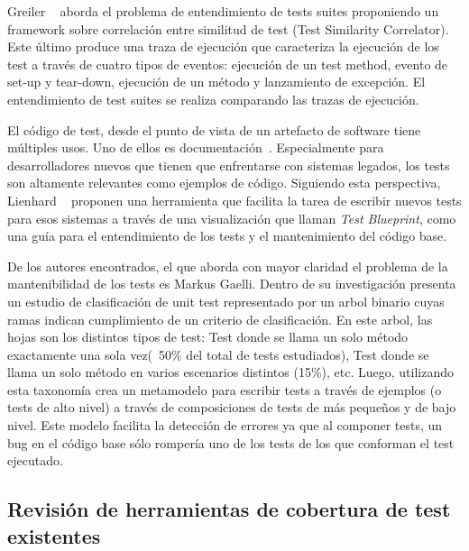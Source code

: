 \par Greiler \etal~\cite{Grei12a} aborda el problema de entendimiento de tests suites proponiendo un framework sobre correlación entre similitud de test (Test Similarity Correlator). Este último produce una traza de ejecución que caracteriza la ejecución de los test a través de cuatro tipos de eventos: ejecución de un test method, evento de set-up y tear-down, ejecución de un método y lanzamiento de excepción. El entendimiento de test suites se realiza comparando las trazas de ejecución.

\par El código de test, desde el punto de vista de un artefacto de software tiene múltiples usos. Uno de ellos es documentación~\cite{Kuhn08a}. Especialmente para desarrolladores nuevos que tienen que enfrentarse con sistemas legados, los tests son altamente relevantes como ejemplos de código. Siguiendo esta perspectiva, Lienhard \etal~\cite{Lien08a} proponen una herramienta que facilita la tarea de escribir nuevos tests para esos sistemas a través de una visualización que llaman \emph{Test Blueprint}, como una guía para el entendimiento de los tests y el mantenimiento del código base.  

\par De los autores encontrados, el que aborda con mayor claridad el problema de la mantenibilidad de los tests es Markus Gaelli. Dentro de su investigación presenta un estudio de clasificación de unit test representado por un arbol binario cuyas ramas indican cumplimiento de un criterio de clasificación. En este arbol, las hojas son los distintos tipos de test: Test donde se llama un solo método exactamente una sola vez(~50\% del total de tests estudiados), Test donde se llama un solo método en varios escenarios distintos (15\%), etc. Luego, utilizando esta taxonomía crea un metamodelo para escribir tests a través de ejemplos (o tests de alto nivel) a través de composiciones de tests de más pequeños y de bajo nivel. Este modelo facilita la detección de errores ya que al componer tests, un bug en el código base sólo rompería uno de los tests de los que conforman el test ejecutado.

\subsection{Revisión de herramientas de cobertura de test existentes}
%

